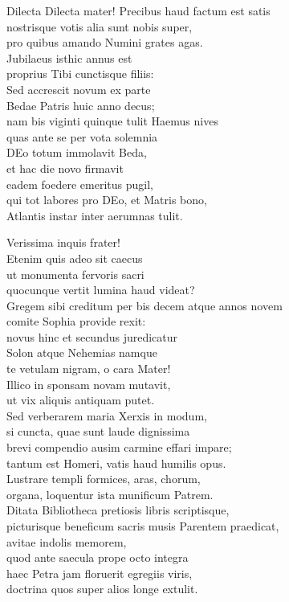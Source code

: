 \documentclass[tocstyle=ref-genre]{ees}
\begin{document}
{\begin{movement}{Dilecta}
  Dilecta mater! Precibus haud factum est satis\\
  nostrisque votis alia sunt nobis super,\\
  pro quibus amando Numini grates agas.\\
  Jubilaeus isthic annus est\\
  proprius Tibi cunctisque filiis:\\
  Sed accrescit novum ex parte\\
  Bedae Patris huic anno decus;\\
  nam bis viginti quinque tulit Haemus nives\\
  quas ante se per vota solemnia\\
  DEo totum immolavit Beda,\\
  et hac die novo firmavit\\
  eadem foedere emeritus pugil,\\
  qui tot labores pro DEo, et Matris bono,\\
  Atlantis instar inter aerumnas tulit.

  Verissima inquis frater!\\
  Etenim quis adeo sit caecus\\
  ut monumenta fervoris sacri\\
  quocunque vertit lumina haud videat?\\
  Gregem sibi creditum per bis decem atque annos novem\\
  comite Sophia provide rexit:\\
  novus hinc et secundus juredicatur\\
  Solon atque Nehemias namque\\
  te vetulam nigram, o cara Mater!\\
  Illico in sponsam novam mutavit,\\
  ut vix aliquis antiquam putet.\\
  Sed verberarem maria Xerxis in modum,\\
  si cuncta, quae sunt laude dignissima\\
  brevi compendio ausim carmine effari impare;\\
  tantum est Homeri, vatis haud humilis opus.\\
  Lustrare templi formices, aras, chorum,\\
  organa, loquentur ista munificum Patrem.\\
  Ditata Bibliotheca pretiosis libris scriptisque,\\
  picturisque beneficum sacris musis Parentem praedicat,\\
  avitae indolis memorem,\\
  quod ante saecula prope octo integra\\
  haec Petra jam floruerit egregiis viris,\\
  doctrina quos super alios longe extulit.


\end{movement}}
\end{document}
